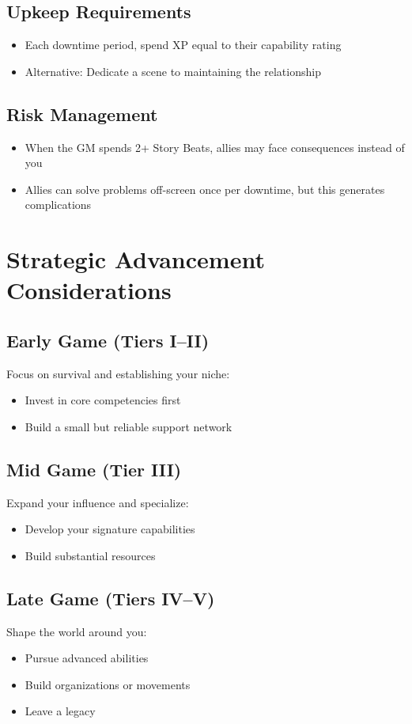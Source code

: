 \subsection*{Upkeep Requirements}
\begin{itemize}
\item Each downtime period, spend XP equal to their capability rating
\item Alternative: Dedicate a scene to maintaining the relationship
\end{itemize}

\subsection*{Risk Management}
\begin{itemize}
\item When the GM spends 2+ Story Beats, allies may face consequences instead of you
\item Allies can solve problems off-screen once per downtime, but this generates complications
\end{itemize}

\section{Strategic Advancement Considerations}

\subsection*{Early Game (Tiers I–II)}
Focus on survival and establishing your niche:
\begin{itemize}
\item Invest in core competencies first
\item Build a small but reliable support network
\end{itemize}

\subsection*{Mid Game (Tier III)}
Expand your influence and specialize:
\begin{itemize}
\item Develop your signature capabilities
\item Build substantial resources
\end{itemize}

\subsection*{Late Game (Tiers IV–V)}
Shape the world around you:
\begin{itemize}
\item Pursue advanced abilities
\item Build organizations or movements
\item Leave a legacy
\end{itemize}

